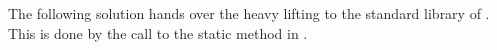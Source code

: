 The following solution hands over the heavy lifting to the standard library of \csharp. This is done by the call to the static  method in .

\inputminted{csharp}{\context/answer/Reverse.cs}
